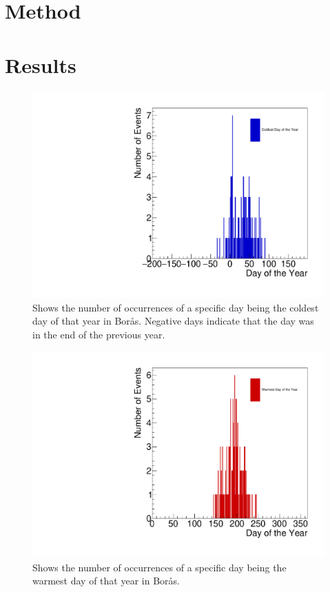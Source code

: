 \documentclass[a4, 12pt]{article}
\begin{document}
\section{Method}



\section{Results}


\begin{figure}[H]
\centering
\includegraphics[scale=0.50]{philipCold.pdf}
\caption{Shows the number of occurrences of a specific day being the coldest day of that year in Borås. Negative days indicate that the day was in the end of the previous year.}
\end{figure}


\begin{figure}[H]
\centering
\includegraphics[scale=0.50]{philipHot.pdf}
\caption{Shows the number of occurrences of a specific day being the warmest day of that year in Borås.}
\end{figure}
\end{document}
